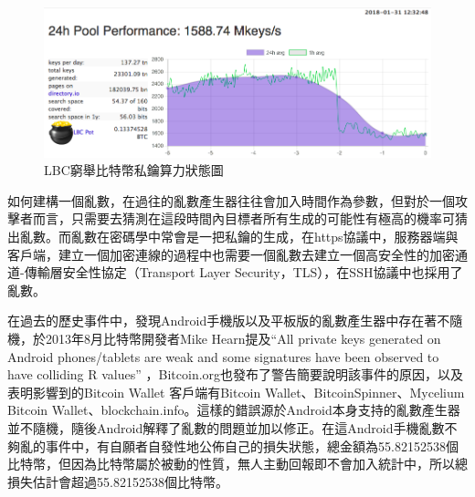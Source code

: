 			\begin{figure}[h]
				\centering
				\includegraphics[width = .9\textwidth]{LBC.png}
				\caption{LBC窮舉比特幣私鑰算力狀態圖\supercite{TheLargeBitcoinCollider}}\label{LBC}
			\end{figure}

			如何建構一個亂數，在過往的亂數產生器往往會加入時間作為參數，但對於一個攻擊者而言，只需要去猜測在這段時間內目標者所有生成的可能性有極高的機率可猜出亂數。而亂數在密碼學中常會是一把私鑰的生成，在https協議中，服務器端與客戶端，建立一個加密連線的過程中也需要一個亂數去建立一個高安全性的加密通道-傳輸層安全性協定（Transport Layer Security，TLS）\supercite{dierks2008transport}，在SSH協議中也採用了亂數。
	
			在過去的歷史事件中，發現Android手機版以及平板版的亂數產生器中存在著不隨機，於2013年8月比特幣開發者Mike Hearn提及“All private keys generated on Android phones/tablets are weak and some signatures have been observed to have colliding R values” \supercite{SomeSecureRandomThoughts}，Bitcoin.org也發布了警告\supercite{AndroidSecurityVulnerability}簡要說明該事件的原因，以及表明影響到的Bitcoin Wallet 客戶端有Bitcoin Wallet、BitcoinSpinner、Mycelium Bitcoin Wallet、blockchain.info。這樣的錯誤源於Android本身支持的亂數產生器並不隨機，隨後Android解釋了亂數的問題並加以修正。在這Android手機亂數不夠亂的事件中，有自願者自發性地公佈自己的損失狀態，總金額為55.82152538個比特幣\supercite{Badsignaturesleading}，但因為比特幣屬於被動的性質，無人主動回報即不會加入統計中，所以總損失估計會超過55.82152538個比特幣。

